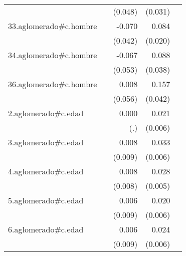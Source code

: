 {\begin{longtable}{l*{4}{D{.}{.}{-1}}}
            &                     &     (0.048)         &     (0.031)         &                     \\
\addlinespace
33.aglomerado#c.hombre&                     &      -0.070         &       0.084\sym{***}&                     \\
            &                     &     (0.042)         &     (0.020)         &                     \\
\addlinespace
34.aglomerado#c.hombre&                     &      -0.067         &       0.088\sym{*}  &                     \\
            &                     &     (0.053)         &     (0.038)         &                     \\
\addlinespace
36.aglomerado#c.hombre&                     &       0.008         &       0.157\sym{***}&                     \\
            &                     &     (0.056)         &     (0.042)         &                     \\
\addlinespace
2.aglomerado#c.edad&                     &       0.000         &       0.021\sym{***}&                     \\
            &                     &         (.)         &     (0.006)         &                     \\
\addlinespace
3.aglomerado#c.edad&                     &       0.008         &       0.033\sym{***}&                     \\
            &                     &     (0.009)         &     (0.006)         &                     \\
\addlinespace
4.aglomerado#c.edad&                     &       0.008         &       0.028\sym{***}&                     \\
            &                     &     (0.008)         &     (0.005)         &                     \\
\addlinespace
5.aglomerado#c.edad&                     &       0.006         &       0.020\sym{***}&                     \\
            &                     &     (0.009)         &     (0.006)         &                     \\
\addlinespace
6.aglomerado#c.edad&                     &       0.006         &       0.024\sym{***}&                     \\
            &                     &     (0.009)         &     (0.006)         &                     \\

\end{longtable}}
